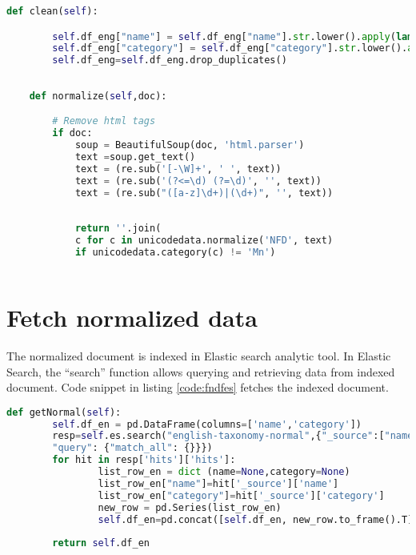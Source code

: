 \clearpage

\begin{lstlisting}[language=Python,caption={Function to normalize text and remove duplicate},label={code:nt}]
    def clean(self):

        self.df_eng["name"]	= self.df_eng["name"].str.lower().apply(lambda n:self.normalize(n)) 
        self.df_eng["category"]	= self.df_eng["category"].str.lower().apply(lambda c:self.normalize(c))
        self.df_eng=self.df_eng.drop_duplicates()
       
    
    def normalize(self,doc):

        # Remove html tags 
        if doc:
            soup = BeautifulSoup(doc, 'html.parser')
            text =soup.get_text()
            text = (re.sub('[-\W]+', ' ', text))
            text = (re.sub('(?<=\d) (?=\d)', '', text))
            text = (re.sub("([a-z]\d+)|(\d+)", '', text))
            
            
            return ''.join(
            c for c in unicodedata.normalize('NFD', text)
            if unicodedata.category(c) != 'Mn')
      
\end{lstlisting}

\section{Fetch normalized data}
The normalized document is indexed in Elastic search analytic tool. In Elastic Search, the ``search'' function allows querying and retrieving data from indexed document. Code snippet in listing \ref{code:fndfes} fetches the indexed document. 

\begin{lstlisting}[language=Python,caption={Fetch normalized data from Elastic search},label={code:fndfes}]
    def getNormal(self):
        self.df_en = pd.DataFrame(columns=['name','category'])
        resp=self.es.search("english-taxonomy-normal",{"_source":["name","category"],                                  'size' : 5000,
        "query": {"match_all": {}}})
        for hit in resp['hits']['hits']:
                list_row_en = dict (name=None,category=None)            
                list_row_en["name"]=hit['_source']['name']             
                list_row_en["category"]=hit['_source']['category']
                new_row = pd.Series(list_row_en)
                self.df_en=pd.concat([self.df_en, new_row.to_frame().T], ignore_index=True)
        
        return self.df_en
      
\end{lstlisting}
